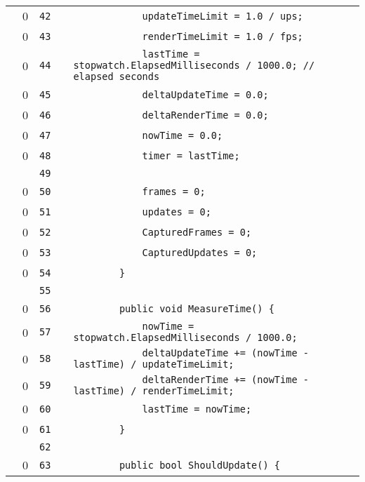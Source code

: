 \documentclass[a4paper,landscape,10pt]{article}
\begin{document}
\begin{longtable}[l]{lrrll}
\cellcolor{red} & 0 & \verb~42~ & & \verb~            updateTimeLimit = 1.0 / ups;~\\
\cellcolor{red} & 0 & \verb~43~ & & \verb~            renderTimeLimit = 1.0 / fps;~\\
\cellcolor{red} & 0 & \verb~44~ & & \verb~            lastTime = stopwatch.ElapsedMilliseconds / 1000.0; // elapsed seconds~\\
\cellcolor{red} & 0 & \verb~45~ & & \verb~            deltaUpdateTime = 0.0;~\\
\cellcolor{red} & 0 & \verb~46~ & & \verb~            deltaRenderTime = 0.0;~\\
\cellcolor{red} & 0 & \verb~47~ & & \verb~            nowTime = 0.0;~\\
\cellcolor{red} & 0 & \verb~48~ & & \verb~            timer = lastTime;~\\
\cellcolor{gray} &  & \verb~49~ & & \verb~~\\
\cellcolor{red} & 0 & \verb~50~ & & \verb~            frames = 0;~\\
\cellcolor{red} & 0 & \verb~51~ & & \verb~            updates = 0;~\\
\cellcolor{red} & 0 & \verb~52~ & & \verb~            CapturedFrames = 0;~\\
\cellcolor{red} & 0 & \verb~53~ & & \verb~            CapturedUpdates = 0;~\\
\cellcolor{red} & 0 & \verb~54~ & & \verb~        }~\\
\cellcolor{gray} &  & \verb~55~ & & \verb~~\\
\cellcolor{red} & 0 & \verb~56~ & & \verb~        public void MeasureTime() {~\\
\cellcolor{red} & 0 & \verb~57~ & & \verb~            nowTime = stopwatch.ElapsedMilliseconds / 1000.0;~\\
\cellcolor{red} & 0 & \verb~58~ & & \verb~            deltaUpdateTime += (nowTime - lastTime) / updateTimeLimit;~\\
\cellcolor{red} & 0 & \verb~59~ & & \verb~            deltaRenderTime += (nowTime - lastTime) / renderTimeLimit;~\\
\cellcolor{red} & 0 & \verb~60~ & & \verb~            lastTime = nowTime;~\\
\cellcolor{red} & 0 & \verb~61~ & & \verb~        }~\\
\cellcolor{gray} &  & \verb~62~ & & \verb~~\\
\cellcolor{red} & 0 & \verb~63~ & & \verb~        public bool ShouldUpdate() {~\\

\end{longtable}
\end{document}
